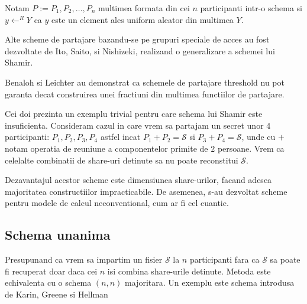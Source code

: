 \documentclass{llncs}
\begin{document}
Notam $P := P_1, P_2, \dots, P_n$ multimea formata din cei $n$ participanti intr-o schema si $y \leftarrow^R Y$ ca $y$ este un element ales uniform aleator din multimea $Y$.

Alte scheme de partajare bazandu-se pe grupuri speciale de acces au fost dezvoltate de Ito, Saito, si Nishizeki, realizand o generalizare a schemei lui Shamir. \cite{ITO:1989}

Benaloh si Leichter au demonstrat ca schemele de partajare threshold nu pot garanta decat construirea unei fractiuni din multimea functiilor de partajare\cite{JJ:1990}.

Cei doi prezinta un exemplu trivial pentru care schema lui Shamir este insuficienta. Consideram cazul in care vrem sa partajam un secret unor 4 participanti: $P_1, P_2, P_3, P_4$ astfel incat $P_1 + P_2 = \mathcal{S}$ si $P_3 + P_4 = \mathcal{S}$, unde cu $+$ notam operatia de reuniune a componentelor primite de $2$ persoane. Vrem ca celelalte combinatii de share-uri detinute sa nu poate reconstitui $\mathcal{S}$.

Dezavantajul acestor scheme este dimensiunea share-urilor, facand adesea majoritatea constructiilor impracticabile. \cite{Survey:2011}
De asemenea, s-au dezvoltat scheme pentru modele de calcul neconventional, cum ar fi cel cuantic. \cite{hillery:1999} %

\subsection{Schema unanima}

Presupunand ca vrem sa impartim un fisier $\mathcal{S}$ la $n$ participanti fara ca $\mathcal{S}$ sa poate fi recuperat doar daca cei $n$ isi combina share-urile detinute. Metoda este echivalenta cu o schema $(n, n)$ majoritara. Un exemplu este schema introdusa de Karin, Greene si Hellman \cite{Karnin:83}
\end{document}
